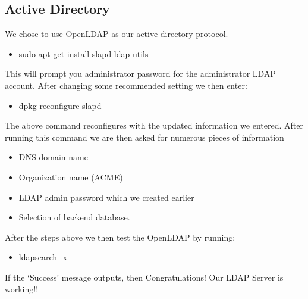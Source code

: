 
\subsection{Active Directory}
We chose to use OpenLDAP as our active directory protocol.

\begin{itemize}
	
	\item sudo apt-get install slapd ldap-utils
	
\end{itemize}

\vspace{.5em}

\noindent This will prompt you administrator password for the administrator LDAP 
account.
After changing some recommended setting we then enter:

\begin{itemize}
	\item dpkg-reconfigure slapd
\end{itemize}

\vspace{.5em}

\noindent The above command reconfigures with the updated information we entered. After 
running this command we are then asked for numerous pieces of information

\begin{itemize}
	\item DNS domain name
	\item Organization name (ACME)
	\item LDAP admin password which we created earlier
	\item Selection of backend database. 
\end{itemize}

\vspace{.5em}

\noindent After the steps above we then test the OpenLDAP by running:

\begin{itemize}
	\item ldapsearch -x
\end{itemize}

\vspace{.5em}

\noindent If the ‘Success’ message outputs, then Congratulations! Our LDAP 
Server is working!!\\ 

